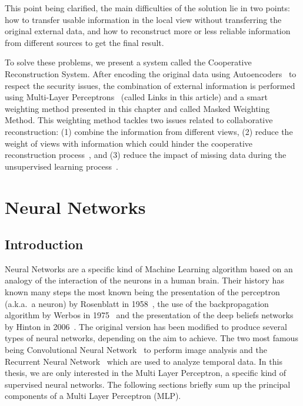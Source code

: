 This point being clarified, the main difficulties of the solution lie in two points: how to transfer usable information in the local view without transferring the original external data, and how to reconstruct more or less reliable information from different sources to get the final result.

To solve these problems, we present a system called the Cooperative Reconstruction System. After encoding the original data using Autoencoders~\cite{hinton2006reducing} to respect the security issues, the combination of external information is performed using Multi-Layer Perceptrons~\cite{rumelhart1985learning} (called Links in this article) and a smart weighting method presented in this chapter and called Masked Weighting Method. This weighting method tackles two issues related to collaborative reconstruction: (1) combine the information from different views, (2) reduce the weight of views with information which could hinder the cooperative reconstruction process~\cite{sublime2018youpi}, and (3) reduce the impact of missing data during the unsupervised learning process~\cite{DBLP:journals/bmcbi/SoutoJC15}.


\section{Neural Networks}
\label{sec:nn}

\subsection{Introduction}

Neural Networks are a specific kind of Machine Learning algorithm based on an analogy of the interaction of the neurons in a human brain. Their history has known many steps the most known being the presentation of the perceptron (a.k.a.\ a neuron) by Rosenblatt in 1958~\cite{rosenblatt1958perceptron}, the use of the backpropagation algorithm by Werbos in 1975~\cite{werbos1974beyond} and the presentation of the deep beliefs networks by Hinton in 2006~\cite{hinton2006fast}. The original version has been modified to produce several types of neural networks, depending on the aim to achieve. The two most famous being Convolutional Neural Network~\cite{krizhevsky2012imagenet} to perform image analysis and the Recurrent Neural Network~\cite{mikolov2010recurrent} which are used to analyze temporal data. In this thesis, we are only interested in the Multi Layer Perceptron, a specific kind of supervised neural networks. The following sections briefly sum up the principal components of a Multi Layer Perceptron (MLP). 

